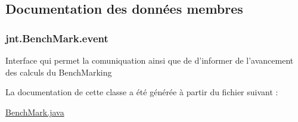 \subsection{Documentation des données membres}
\hypertarget{classjnt_1_1BenchMark_abcb332d393fba2c18c7cb700bd651366}{
\subsubsection[{event}]{ jnt.\-Bench\-Mark.\-event\hspace{0.3cm}{\ttfamily [private]}}}\label{classjnt_1_1BenchMark_abcb332d393fba2c18c7cb700bd651366}
Interface qui permet la comuniquation ainsi que de d'informer de l'avancement des calculs du Bench\-Marking 

La documentation de cette classe a été générée à partir du fichier suivant \-:\begin{DoxyCompactItemize}
\item 
\hyperlink{BenchMark_8java}{Bench\-Mark.\-java}\end{DoxyCompactItemize}
